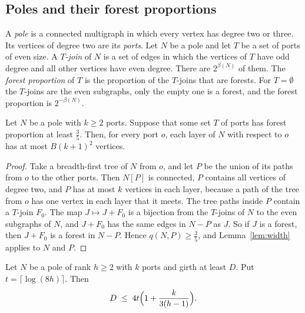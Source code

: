 \subsection{Poles and their forest proportions}

A \emph{pole} is a connected multigraph in which every vertex has degree two or three. Its
vertices of degree two are its \emph{ports}. Let $N$ be a pole and let $T$ be a set of ports of even
size. A \emph{$T$-join} of $N$ is a set of edges in which the vertices of $T$ have odd degree and
all other vertices have even degree. There are $2^{\beta(N)}$ of them. The \emph{forest proportion}
of $T$ is the proportion of the $T$-joins that are forests. For $T=\emptyset$ the $T$-joins are the
even subgraphs, only the empty one is a forest, and the forest proportion is $2^{-\beta(N)}$.

\begin{lemma}\label{lem:marker}
Let $N$ be a pole with $k\ge2$ ports. Suppose that some set $T$ of ports has forest proportion at
least $\frac35$. Then, for every port $o$, each layer of $N$ with respect to $o$ has at most
$B(k+1)^{2}$ vertices.
\end{lemma}

\begin{proof}
Take a breadth-first tree of $N$ from $o$, and let $P$ be the union of its paths from $o$ to the
other ports. Then $N[P]$ is connected, $P$ contains all vertices of degree two, and $P$ has at most
$k$ vertices in each layer, because a path of the tree from $o$ has one vertex in each layer that
it meets. The tree paths inside $P$ contain a $T$-join $F_0$. The map $J\mapsto J+F_0$ is a
bijection from the $T$-joins of $N$ to the even subgraphs of $N$, and $J+F_0$ has the same edges in
$N-P$ as $J$. So if $J$ is a forest, then $J+F_0$ is a forest in $N-P$. Hence
$q(N,P)\ge\frac35$, and Lemma~\ref{lem:width} applies to $N$ and $P$.
\end{proof}

\begin{lemma}\label{lem:moore}
Let $N$ be a pole of rank $h\ge2$ with $k$ ports and girth at least $D$. Put
$t=\lceil\log(8h)\rceil$. Then
\[
  D\;\le\;4t\Bigl(1+\frac{k}{3(h-1)}\Bigr).
\]
\end{lemma}

